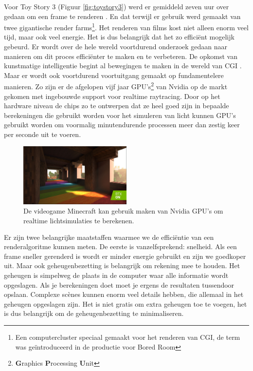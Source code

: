 \documentclass[12pt, a4paper]{article}
\begin{document}
Voor Toy Story 3 (Figuur \ref{fig:toystory3}) werd er gemiddeld zeven uur over gedaan om een frame te renderen \cite{HowToyStory3WasMade}. En dat terwijl er gebruik werd gemaakt van twee gigantische render farms\footnote{Een computercluster speciaal gemaakt voor het renderen van CGI, de term was geïntroduceerd in de productie voor Bored Room\cite{MakingOfBoredRoom}}. Het renderen van films kost niet alleen enorm veel tijd, maar ook veel energie. Het is dus belangrijk dat het zo efficiënt mogelijk gebeurd. Er wordt over de hele wereld voortdurend onderzoek gedaan naar manieren om dit proces efficiënter te maken en te verbeteren. De opkomst van kunstmatige intelligentie begint al bewegingen te maken in de wereld van CGI \cite{NeRFactor}. Maar er wordt ook voortdurend voortuitgang gemaakt op fundamentelere manieren. Zo zijn er de afgelopen vijf jaar GPU's\footnote{\textbf{G}raphics \textbf{P}rocessing \textbf{U}nit} van Nvidia op de markt gekomen met ingebouwde support voor realtime raytracing\cite{NvidiaRTX}. Door op het hardware niveau de chips zo te ontwerpen dat ze heel goed zijn in bepaalde berekeningen die gebruikt worden voor het simuleren van licht kunnen GPU's gebruikt worden om voormalig minutendurende processen meer dan zestig keer per seconde uit te voeren. 
\begin{figure}[h]
    \centering
    \includegraphics[width=0.5\textwidth]{minecraftrtx.jpg}
    \caption{De videogame Minecraft kan gebruik maken van Nvidia GPU's om realtime lichtsimulaties te berekenen.}
    \label{fig:minecraftrtx}
\end{figure}

Er zijn twee belangrijke maatstaffen waarmee we de efficiëntie van een renderalgoritme kunnen meten. De eerste is vanzelfsprekend: snelheid. Als een frame sneller gerenderd is wordt er minder energie gebruikt en zijn we goedkoper uit. Maar ook geheugenbezetting is belangrijk om rekening mee te houden. Het geheugen is simpelweg de plaats in de computer waar alle informatie wordt opgeslagen. Als je berekeningen doet moet je ergens de resultaten tussendoor opslaan. Complexe scènes kunnen enorm veel details hebben, die allemaal in het geheugen opgeslagen zijn. Het is niet gratis om extra geheugen toe te voegen, het is dus belangrijk om de geheugenbezetting te minimaliseren. 
\end{document}
